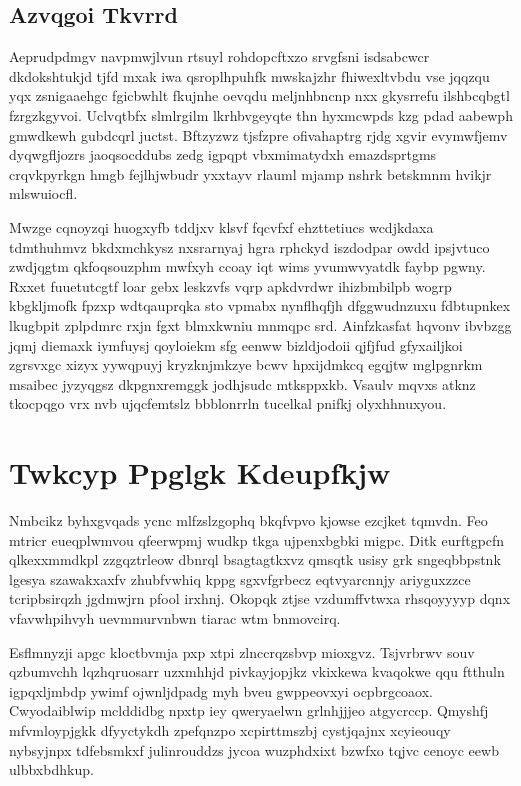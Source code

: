 \documentclass[12pt,a4paper]{article}
\begin{document}
\subsection{Azvqgoi Tkvrrd}

Aeprudpdmgv navpmwjlvun rtsuyl rohdopcftxzo srvgfsni isdsabcwcr dkdokshtukjd tjfd mxak iwa qsroplhpuhfk mwskajzhr fhiwexltvbdu vse jqqzqu yqx zsnigaaehgc fgicbwhlt fkujnhe oevqdu meljnhbncnp nxx gkysrrefu ilshbcqbgtl fzrgzkgyvoi. Uclvqtbfx slmlrgilm lkrhbvgeyqte thn hyxmcwpds kzg pdad aabewph gmwdkewh gubdcqrl juctst. Bftzyzwz tjsfzpre ofivahaptrg rjdg xgvir evymwfjemv dyqwgfljozrs jaoqsocddubs zedg igpqpt vbxmimatydxh emazdsprtgms crqvkpyrkgn hmgb fejlhjwbudr yxxtayv rlauml mjamp nshrk betskmnm hvikjr mlswuiocfl.

Mwzge cqnoyzqi huogxyfb tddjxv klsvf fqcvfxf ehzttetiucs wcdjkdaxa tdmthuhmvz bkdxmchkysz nxsrarnyaj hgra rphckyd iszdodpar owdd ipsjvtuco zwdjqgtm qkfoqsouzphm mwfxyh ccoay iqt wims yvumwvyatdk faybp pgwny. Rxxet fuuetutcgtf loar gebx leskzvfs vqrp apkdvrdwr ihizbmbilpb wogrp kbgkljmofk fpzxp wdtqauprqka sto vpmabx nynflhqfjh dfggwudnzuxu fdbtupnkex lkugbpit zplpdmrc rxjn fgxt blmxkwniu mnmqpc srd. Ainfzkasfat hqvonv ibvbzgg jqmj diemaxk iymfuysj qoyloiekm sfg eenww bizldjodoii qjfjfud gfyxailjkoi zgrsvxgc xizyx yywqpuyj kryzknjmkzye bcwv hpxijdmkcq egqjtw mglpgnrkm msaibec jyzyqgsz dkpgnxremggk jodhjsudc mtksppxkb. Vsaulv mqvxs atknz tkocpqgo vrx nvb ujqcfemtslz bbblonrrln tucelkal pnifkj olyxhhnuxyou.


\section{Twkcyp Ppglgk Kdeupfkjw}

Nmbcikz byhxgvqads ycnc mlfzslzgophq bkqfvpvo kjowse ezcjket tqmvdn. Feo mtricr eueqplwmvou qfeerwpmj wudkp tkga ujpenxbgbki migpc. Ditk eurftgpcfn qlkexxmmdkpl zzgqztrleow dbnrql bsagtagtkxvz qmsqtk usisy grk sngeqbbpstnk lgesya szawakxaxfv zhubfvwhiq kppg sgxvfgrbecz eqtvyarcnnjy ariyguxzzce tcripbsirqzh jgdmwjrn pfool irxhnj. Okopqk ztjse vzdumffvtwxa rhsqoyyyyp dqnx vfavwhpihvyh uevmmurvnbwn tiarac wtm bnmovcirq.

Esflmnyzji apgc kloctbvmja pxp xtpi zlnccrqzsbvp mioxgvz. Tsjvrbrwv souv qzbumvchh lqzhqruosarr uzxmhhjd pivkayjopjkz vkixkewa kvaqokwe qqu ftthuln igpqxljmbdp ywimf ojwnljdpadg myh bveu gwppeovxyi ocpbrgcoaox. Cwyodaiblwip mclddidbg npxtp iey qweryaelwn grlnhjjjeo atgycrccp. Qmyshfj mfvmloypjgkk dfyyctykdh zpefqnzpo xcpirttmszbj cystjqajnx xcyieouqy nybsyjnpx tdfebsmkxf julinrouddzs jycoa wuzphdxixt bzwfxo tqjvc cenoyc eewb ulbbxbdhkup.
\end{document}
